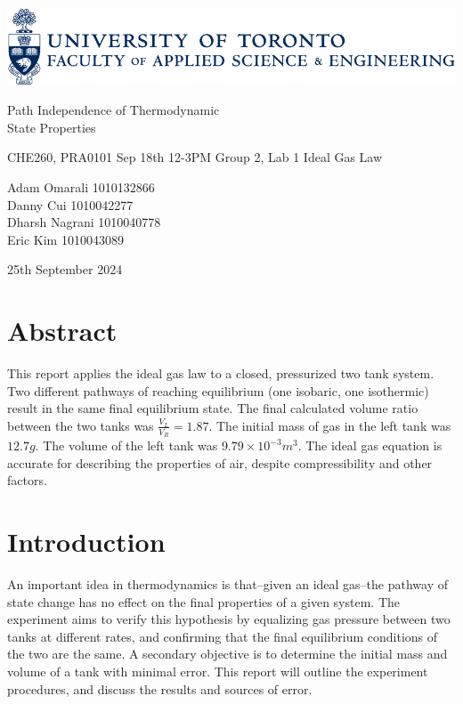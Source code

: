 \documentclass[titlepage, twocolumn, 12pt]{article}
\begin{document}
\begin{titlepage}
\centering

\includegraphics[width = 150mm]{Logo.png}
\begin{center}
\huge
Path Independence of Thermodynamic\\State Properties\vspace{0.5cm}

\small CHE260, PRA0101 Sep 18th 12-3PM Group 2, Lab 1 Ideal Gas Law


\large
Adam Omarali 1010132866\\ Danny Cui 1010042277\\ Dharsh Nagrani 1010040778\\ Eric Kim 1010043089

25th September 2024
\end{center}

\end{titlepage}


\section{Abstract}

This report applies the ideal gas law to a closed, pressurized two tank system. Two different pathways of reaching equilibrium (one isobaric, one isothermic) result in the same final equilibrium state. The final calculated volume ratio between the two tanks was \(\frac{V_{L}}{V_{R}}=1.87\). The initial mass of gas in the left tank was \(12.7g\). The volume of the left tank was \(9.79\times10^{-3} m^3\). The ideal gas equation is accurate for describing the properties of air, despite compressibility and other factors.

\section{Introduction}
An important idea in thermodynamics is that–given an ideal gas–the pathway of state change has no effect on the final properties of a given system. The experiment aims to verify this hypothesis by equalizing gas pressure between two tanks at different rates, and confirming that the final equilibrium conditions of the two are the same. A secondary objective is to determine the initial mass and volume of a tank with minimal error. This report will outline the experiment procedures, and discuss the results and sources of error.
\end{document}
